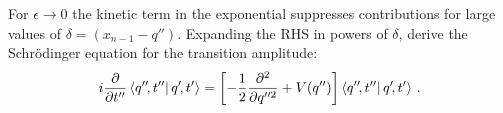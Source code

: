 \documentclass{tutorial}
\begin{document}
    For $\epsilon\to 0$ the kinetic term in the exponential suppresses
    contributions for large values of $\delta=(x_{n-1}-q'')$. Expanding the
    RHS in powers of $\delta$, derive the Schr\"odinger equation for
    the transition amplitude: 
    \[
      i \pdv{t''} \braket{q''\!, t''}{\,q'\!, t'} = 
      \left[-\frac12 \frac{\partial^2}{\partial q''^2} + V(q'') \right]
      \braket{q''\!, t''}{\, q'\!, t'}\, .
    \]
    
    
\end{document}
